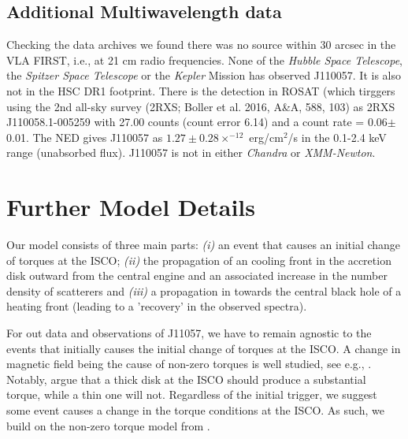 \documentclass[11pt,a4paper]{article}
\begin{document}
\subsection*{Additional Multiwavelength data}
Checking the data archives we found there was no source within 30
arcsec in the VLA FIRST, i.e., at 21 cm radio frequencies.  None of
the {\it Hubble Space Telescope}, the {\it Spitzer Space Telescope} or
the {\it Kepler} Mission has observed J110057.  It is also not in the
HSC DR1 footprint.  There is the detection in ROSAT (which tirggers  using the 2nd
all-sky survey (2RXS; Boller et al. 2016, A\&A, 588, 103) as 2RXS
J110058.1-005259 with 27.00 counts (count error 6.14) and a count rate
= 0.06$\pm$0.01. The NED gives J110057 as $1.27\pm0.28 \times^{-12}$
erg/cm$^{2}$/s in the 0.1-2.4 keV range (unabsorbed flux). J110057 is
not in either {\it Chandra} or {\it XMM-Newton}.



\section*{Further Model Details}

Our model consists of three main parts: {\it (i)} an event that causes
an initial change of torques at the ISCO; {\it (ii)} the propagation
of an cooling front in the accretion disk outward from the central
engine and an associated increase in the number density of scatterers
and {\it (iii)} a propagation in towards the central black hole of a
heating front (leading to a 'recovery' in the observed spectra).

For out data and observations of J11057, we have to remain agnostic to
the events that initially causes the initial change of torques at the
ISCO.  A change in magnetic field being the cause of non-zero torques
is well studied, see e.g., \citet{Krolik1999, Gammie1999,
Agol_Krolik2000, Reynolds_Armitage2001}.  Notably,
\citet{Afshordi_Paczynski2003} argue that a thick disk at the ISCO
should produce a substantial torque, while a thin one will not.
Regardless of the initial trigger, we suggest some event causes 
a change in the torque conditions at the ISCO. As such, we build 
on the non-zero torque model from \citet{Zimmerman2005}. 
\end{document}
